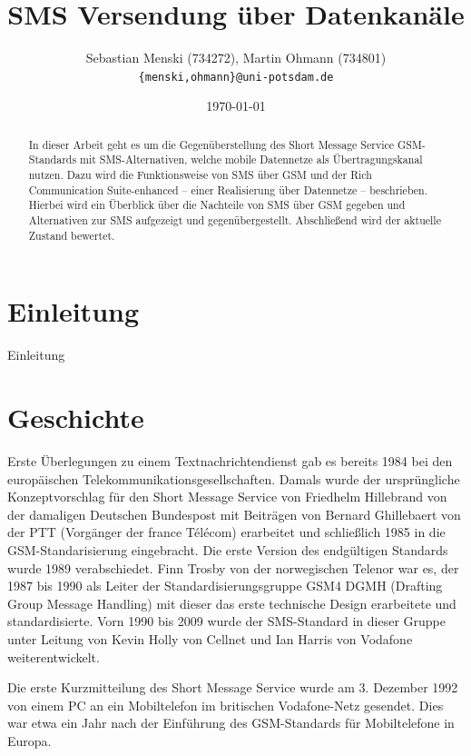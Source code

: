 \documentclass[german,12pt,a4paper]{article}
\begin{document}
\title{\textbf{SMS Versendung über Datenkanäle}}
\author{Sebastian Menski (734272), Martin Ohmann (734801) \\ \texttt{\{menski,ohmann\}@uni-potsdam.de}}
\date{\today}

\maketitle

\begin{abstract}
In dieser Arbeit geht es um die Gegenüberstellung des Short Message Service
GSM-Standards mit SMS-Alternativen, welche mobile Datennetze als Übertragungskanal
nutzen. Dazu wird die Funktionsweise von SMS über GSM und der Rich Communication Suite-enhanced
-- einer Realisierung über Datennetze -- beschrieben. Hierbei wird ein Überblick über die Nachteile
von SMS über GSM gegeben und Alternativen zur SMS aufgezeigt und gegenübergestellt. Abschließend
wird der aktuelle Zustand bewertet.
\end{abstract}

\section{Einleitung}
Einleitung

\section{Geschichte}
Erste Überlegungen zu einem Textnachrichtendienst gab es bereits 1984 bei den 
europäischen Telekommunikationsgesellschaften. Damals wurde der ursprüngliche 
Konzeptvorschlag für den Short Message Service von Friedhelm Hillebrand von der 
damaligen Deutschen Bundespost mit Beiträgen von Bernard Ghillebaert von der PTT 
(Vorgänger der france Télécom) erarbeitet und schließlich 1985 in die 
GSM-Standarisierung eingebracht. Die erste Version des endgültigen Standards 
wurde 1989 verabschiedet. Finn Trosby von der norwegischen Telenor war es, der 
1987 bis 1990 als Leiter der Standardisierungsgruppe GSM4 DGMH (Drafting Group 
Message Handling) mit dieser das erste technische Design erarbeitete und 
standardisierte.
Vorn 1990 bis 2009 wurde der SMS-Standard in dieser Gruppe unter Leitung von 
Kevin Holly von Cellnet und Ian Harris von Vodafone weiterentwickelt\cite{wikipedia:sms}.

Die erste Kurzmitteilung des Short Message Service wurde am 3. Dezember 1992 
von einem PC an ein Mobiltelefon im britischen Vodafone-Netz gesendet. Dies 
war etwa ein Jahr nach der Einführung des GSM-Standards für Mobiltelefone in 
Europa.
\end{document}
